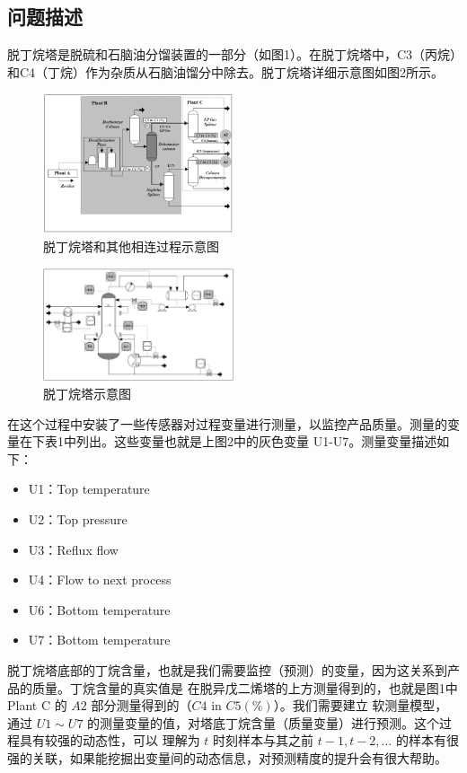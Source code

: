 \documentclass[11pt,a4paper]{elegantpaper}
\begin{document}
\begin{multicols}{2}
\subsection{问题描述}

脱丁烷塔是脱硫和石脑油分馏装置的一部分（如图1）。在脱丁烷塔中，C3（丙烷）和C4（丁烷）作为杂质从石脑油馏分中除去。脱丁烷塔详细示意图如图2所示。

\begin{figure}[H]
  \centering
  \includegraphics[width=0.5\textwidth]{images/TT.png}
  \caption{脱丁烷塔和其他相连过程示意图} 
\end{figure}

\begin{figure}[H]
  \centering
  \includegraphics[width=0.5\textwidth]{images/TTT.png}
  \caption{脱丁烷塔示意图} 
\end{figure}

在这个过程中安装了一些传感器对过程变量进行测量，以监控产品质量。测量的变量在下表1中列出。这些变量也就是上图2中的灰色变量 U1-U7。测量变量描述如下：

\begin{itemize}
  \item U1：Top temperature
  \item U2：Top pressure
  \item U3：Reflux flow
  \item U4：Flow to next process
  \item U6：Bottom temperature
  \item U7：Bottom temperature
\end{itemize}

脱丁烷塔底部的丁烷含量，也就是我们需要监控（预测）的变量，因为这关系到产品的质量。丁烷含量的真实值是
在脱异戊二烯塔的上方测量得到的，也就是图1中 Plant C 的 $A2$ 部分测量得到的（$C4$ in $C5(\%)$）。我们需要建立
软测量模型，通过 $U1\sim U7$ 的测量变量的值，对塔底丁烷含量（质量变量）进行预测。这个过程具有较强的动态性，可以
理解为 $t$ 时刻样本与其之前 $t-1,t-2,\dots$ 的样本有很强的关联，如果能挖掘出变量间的动态信息，对预测精度的提升会有很大帮助。


\end{multicols}
\end{document}
